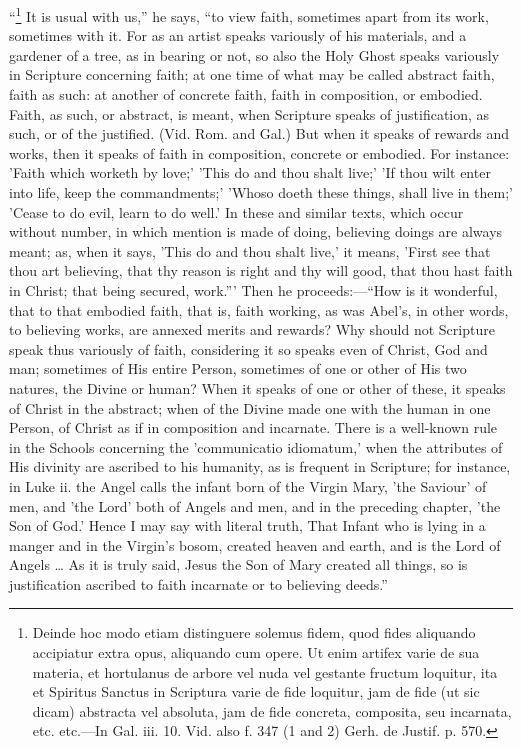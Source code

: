 ``\footnote{Deinde hoc modo
etiam distinguere solemus fidem, quod fides aliquando accipiatur extra
opus, aliquando cum opere. Ut enim artifex varie de sua materia, et
hortulanus de arbore vel nuda vel gestante fructum loquitur, ita et
Spiritus Sanctus in Scriptura varie de fide loquitur, jam de fide (ut
sic dicam) abstracta vel absoluta, jam de fide concreta, composita,
seu incarnata, etc. etc.—In Gal. iii. 10. Vid. also f. 347 (1 and 2)
Gerh. de Justif. p. 570.} It is usual with
us,'' he says, ``to view faith, sometimes apart from its work,
sometimes with it. For as an artist speaks variously of his materials,
and a gardener of a tree, as in bearing or not, so also the Holy Ghost
speaks variously in Scripture concerning faith; at one time of what
may be called abstract faith, faith as such: at another of concrete
faith, faith in composition, or embodied. Faith, as such, or abstract,
is meant, when Scripture speaks of justification, as such, or of the
justified. (Vid. Rom. and Gal.) But when it speaks of rewards and
works, then it speaks of faith in composition, concrete or embodied.
For instance: 'Faith which worketh by love;' 'This do and thou shalt
live;' 'If thou wilt enter into life, keep the commandments;' 'Whoso
doeth these things, shall live in them;' 'Cease to do evil, learn to
do well.' In these and similar texts, which occur without number, in
which mention is made of doing, believing doings are always
meant; as, when it says, 'This do and thou shalt live,' it means,
'First see that thou art believing, that thy reason is right and thy
will good, that thou hast faith in Christ; that being secured,
work.''' Then he proceeds:—``How is it wonderful, that to
that embodied faith, that is, faith working, as was Abel's, in other
words, to believing works, are annexed merits and rewards? Why should
not Scripture speak thus variously of faith, considering it so speaks
even of Christ, God and man; sometimes of His entire Person, sometimes
of one or other of His two natures, the Divine or human? When it
speaks of one or other of these, it speaks of Christ in the abstract;
when of the Divine made one with the human in one Person, of Christ as
if in composition and incarnate. There is a well-known rule in the
Schools concerning the 'communicatio idiomatum,' when the attributes
of His divinity are ascribed to his humanity, as is frequent in
Scripture; for instance, in Luke ii. the Angel calls the infant born
of the Virgin Mary, 'the Saviour' of men, and 'the Lord' both of
Angels and men, and in the preceding chapter, 'the Son of God.' Hence
I may say with literal truth, That Infant who is lying in a manger and
in the Virgin's bosom, created heaven and earth, and is the Lord of
Angels … As it is truly said, Jesus the Son of Mary created all
things, so is justification ascribed to faith incarnate or to
believing deeds.''

